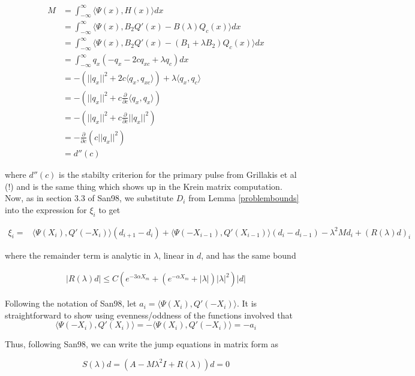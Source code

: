 \documentclass[12pt]{article}
\begin{document}
\begin{align*}
M &= \int_{-\infty}^\infty \langle \Psi(x), H(x) \rangle dx \\
&= \int_{-\infty}^\infty \langle \Psi(x), B_2 Q'(x) - B(\lambda)Q_c(x) \rangle dx \\
&= \int_{-\infty}^\infty \langle \Psi(x), B_2 Q'(x) - (B_1 + \lambda B_2)Q_c(x) \rangle dx \\
&= \int_{-\infty}^\infty q_x(-q_x - 2c q_{xc} + \lambda q_c) dx \\
&= -( ||q_x||^2 + 2c \langle q_x, q_{xc} \rangle ) + \lambda \langle q_x, q_c \rangle \\
&= -\left( ||q_x||^2 + c \frac{\partial}{\partial c}\langle q_x, q_x \rangle \right) \\
&= -\left( ||q_x||^2 + c \frac{\partial}{\partial c} ||q_x||^2 \right) \\
&= -\frac{\partial}{\partial c} \left( c ||q_x||^2 \right) \\
&= d''(c)
\end{align*}

where $d''(c)$ is the stabilty criterion for the primary pulse from Grillakis et al (!) and is the same thing which shows up in the Krein matrix computation. \\

Now, as in section 3.3 of San98, we substitute $D_i$ from Lemma \ref{problembounds} into the expression for $\xi_i$ to get 


\begin{align}
\xi_i = &\langle \Psi(X_i), Q'(-X_i) \rangle (d_{i+1} - d_i) + \langle \Psi(-X_{i-1}), Q'(X_{i-1}) \rangle (d_i - d_{i-1})
- \lambda^2 M d_i  + (R(\lambda)d)_i
\end{align}

where the remainder term is analytic in $\lambda$, linear in $d$, and has the same bound

\begin{align}
|R(\lambda)d| \leq C( e^{-3 \alpha X_m} + ( e^{-\alpha X_m} + |\lambda|)|\lambda|^2 )|d|
\end{align}

Following the notation of San98, let $a_i = \langle \Psi(X_i), Q'(-X_i) \rangle$. It is straightforward to show using evenness/oddness of the functions involved that 
\[
\langle \Psi(-X_i), Q'(X_i) \rangle = -\langle \Psi(X_i), Q'(-X_i) \rangle = -a_i
\]

Thus, following San98, we can write the jump equations in matrix form as

\begin{equation}
S(\lambda)d = (A - M \lambda^2 I + R(\lambda))d = 0
\end{equation}
\end{document}
